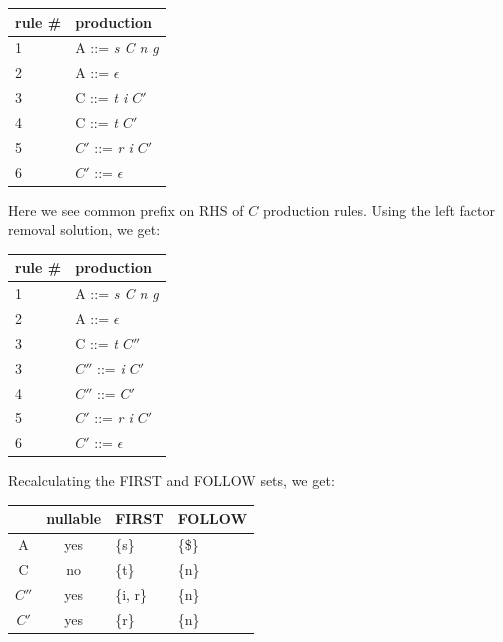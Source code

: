 \documentclass{article}
\begin{document}
    \begin{center}
        \begin{tabular}{ l l }
        \hline
        rule \# & production \\
        \hline
        1   &   A   ::= \textit{s C n g} \\
        2   &   A   ::= $\epsilon$ \\
        3   &   C   ::= \textit{t i $C'$} \\
        4   &   C   ::= \textit{t $C'$} \\
        5   &   $C'$  ::= \textit{r i $C'$} \\
        6   &   $C'$  ::= $\epsilon$ \\
        \end{tabular}
    \end{center}

    Here we see common prefix on RHS of $C$ production rules. Using the left factor removal solution, we get:

    \begin{center}
        \begin{tabular}{ l l }
        \hline
        rule \# & production \\
        \hline
        1   &   A   ::= \textit{s C n g} \\
        2   &   A   ::= $\epsilon$ \\
        3   &   C   ::= \textit{t $C''$} \\
        3   &   $C''$   ::= \textit{i $C'$} \\
        4   &   $C''$   ::= \textit{$C'$} \\
        5   &   $C'$  ::= \textit{r i $C'$} \\
        6   &   $C'$  ::= $\epsilon$ \\
        \end{tabular}
    \end{center}

    Recalculating the FIRST and FOLLOW sets, we get:

    \begin{center}
        \begin{tabular}{ c c l l }
            \hline
            & nullable & FIRST & FOLLOW \\
            \hline
            A & yes & \{s\} & \{\$\} \\
            C & no & \{t\} & \{n\} \\
            $C''$ & yes & \{i, r\} & \{n\} \\
            $C'$ & yes & \{r\} & \{n\} \\
        \end{tabular}
    \end{center}
\end{document}
